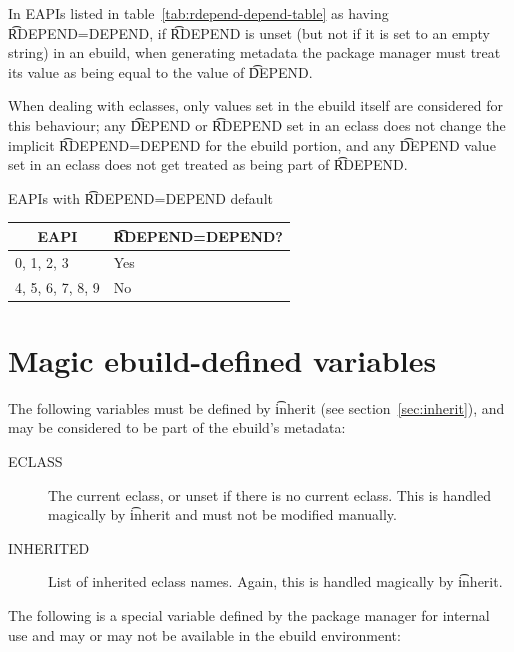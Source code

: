  In EAPIs listed in table~\ref{tab:rdepend-depend-table} as having
\t{RDEPEND=DEPEND}, if \t{RDEPEND} is unset (but not if it is set to an empty string) in an ebuild,
when generating metadata the package manager must treat its value as being equal to the value of
\t{DEPEND}.

When dealing with eclasses, only values set in the ebuild itself are considered for this behaviour;
any \t{DEPEND} or \t{RDEPEND} set in an eclass does not change the implicit \t{RDEPEND=DEPEND} for
the ebuild portion, and any \t{DEPEND} value set in an eclass does not get treated as being part of
\t{RDEPEND}.

\begin{centertable}{EAPIs with \t{RDEPEND=DEPEND} default}
    \label{tab:rdepend-depend-table}
    \begin{tabular}{ll}
      \toprule
      \multicolumn{1}{c}{\textbf{EAPI}} &
      \multicolumn{1}{c}{\textbf{\t{RDEPEND=DEPEND}?}} \\
      \midrule
      0, 1, 2, 3        & Yes \\
      4, 5, 6, 7, 8, 9  & No  \\
      \bottomrule
    \end{tabular}
\end{centertable}

\section{Magic ebuild-defined variables}

The following variables must be defined by \t{inherit} (see section~\ref{sec:inherit}), and may be
considered to be part of the ebuild's metadata:

\begin{description}
\item[ECLASS] The current eclass, or unset if there is no current eclass. This is handled magically
    by \t{inherit} and must not be modified manually.
\item[INHERITED] List of inherited eclass names. Again, this is handled magically by \t{inherit}.
\end{description}


The following is a special variable defined by the package manager for internal use and may or may
not be available in the ebuild environment:

